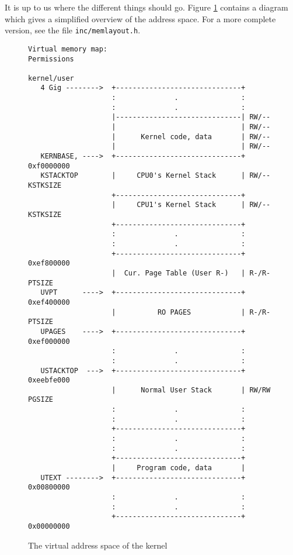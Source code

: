 \documentclass{article}
\begin{document}
It is up to us where the different things should go. Figure \ref{memlayout}
contains a diagram which gives a simplified overview of the address space. For
a more complete version, see the file \texttt{inc/memlayout.h}.
\begin{figure}[h!]
    \centering
\begin{Verbatim}[fontsize=\small]
Virtual memory map:                                  Permissions
                                                     kernel/user
   4 Gig -------->  +------------------------------+
                    :              .               :
                    :              .               :
                    |------------------------------| RW/--
                    |                              | RW/--
                    |      Kernel code, data       | RW/--
                    |                              | RW/--
   KERNBASE, ---->  +------------------------------+ 0xf0000000      
   KSTACKTOP        |     CPU0's Kernel Stack      | RW/--  KSTKSIZE 
                    +------------------------------+                 
                    |     CPU1's Kernel Stack      | RW/--  KSTKSIZE 
                    +------------------------------+                 
                    :              .               :                 
                    :              .               :                 
                    +------------------------------+ 0xef800000
                    |  Cur. Page Table (User R-)   | R-/R-  PTSIZE
   UVPT      ---->  +------------------------------+ 0xef400000
                    |          RO PAGES            | R-/R-  PTSIZE
   UPAGES    ---->  +------------------------------+ 0xef000000
                    :              .               :                 
                    :              .               :                 
   USTACKTOP  --->  +------------------------------+ 0xeebfe000
                    |      Normal User Stack       | RW/RW  PGSIZE
                    :              .               :                 
                    :              .               :                 
                    +------------------------------+
                    :              .               :
                    :              .               :
                    +------------------------------+
                    |     Program code, data       |
   UTEXT -------->  +------------------------------+ 0x00800000
                    :              .               :                 
                    :              .               :                 
                    +------------------------------+ 0x00000000
\end{Verbatim}
    \caption{The virtual address space of the kernel}
    \label{memlayout}
\end{figure}
\end{document}
